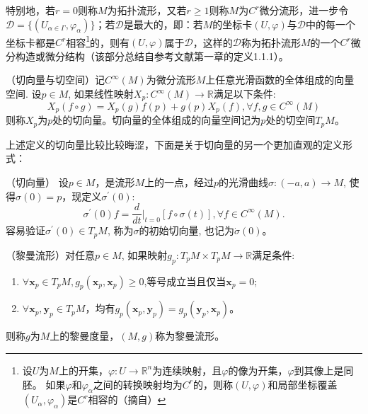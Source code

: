 特别地，若$r=0$则称$M$为拓扑流形，又若$r\geq 1$则称$M$为$C^r$微分流形，进一步令$\mathcal{D}=\{(U_{\alpha \in \Gamma},\varphi_\alpha)\}$；若$\mathcal{D}$是最大的，即：若$M$的坐标卡$(U,\varphi)$与$\mathcal{D}$中的每一个坐标卡都是$C^r$相容\footnote{设$U$为$M$上的开集，$\varphi:U \rightarrow \mathbb{R}^{n}$为连续映射，且$\varphi$的像为开集，$\varphi$到其像上是同胚。 如果$\varphi$和$\varphi_\alpha$之间的转换映射均为$C^r$的，则称$(U,\varphi)$和局部坐标覆盖$(U_\alpha, \varphi_{\alpha})$是$C^r$相容的（摘自\cite{Manifold}）}的，则有$(U,\varphi)$属于$\mathcal{D}$，这样的$\mathcal{D}$称为拓扑流形$M$的一个$C^r$微分构造或微分结构（该部分总结自参考文献\cite{Manifold}第一章的定义1.1.1）。
\begin{definition}[a]
\label{Tangent_Vector_a}
{\heiti（切向量与切空间）}记$C^\infty(M)$为微分流形$M$上任意光滑函数的全体组成的向量空间. 设$p \in M$, 如果线性映射$X_p : C^\infty(M) \rightarrow \mathbb{R}$满足以下条件:
\begin{displaymath}
X_p(f\circ g) = X_p(g)f(p)+g(p)X_p(f),\forall f,g \in C^\infty(M)
\end{displaymath}
则称$X_p$为$p$处的切向量。切向量的全体组成的向量空间记为$p$处的切空间$T_pM$。
\end{definition}
上述定义的切向量比较比较晦涩，下面是关于切向量的另一个更加直观的定义形式：
\addtocounter{definition}{-1}
\begin{definition}[b]
\label{Tangent_Vector_b}
{\heiti（切向量）}
设$p\in M$，是流形$M$上的一点，经过$p$的光滑曲线$\sigma: (-a,a) \rightarrow  M$, 使得$\sigma(0)=p$，现定义$\sigma^{\prime}(0)$:
\begin{displaymath}
\sigma^{\prime}(0)f=\frac{d}{dt}|_{t=0}[f\circ\sigma(t)],\forall f \in C^\infty(M).
\end{displaymath}
容易验证$\sigma^{\prime}(0)\in T_pM$, 称为$\sigma$的初始切向量, 也记为$\dot{\sigma}(0)$。
\end{definition}
\begin{definition}
{\heiti（黎曼流形）}对任意$p\in M$, 如果映射$g_p : T_pM \times T_pM \rightarrow \mathbb{R}$满足条件:
\begin{enumerate}
\item $\forall \bm{x}_p \in T_p M,g_p(\bm{x}_p,\bm{x}_p)\geq 0$,等号成立当且仅当$\bm{x}_p=0$;
\item $\forall \bm{x}_p,\bm{y}_p \in T_p M$，均有$g_p(\bm{x}_p,\bm{y}_p)=g_p(\bm{y}_p,\bm{x}_p)$。
\end{enumerate}
则称$g$为$M$上的黎曼度量，$(M,g)$称为黎曼流形。
\end{definition}
